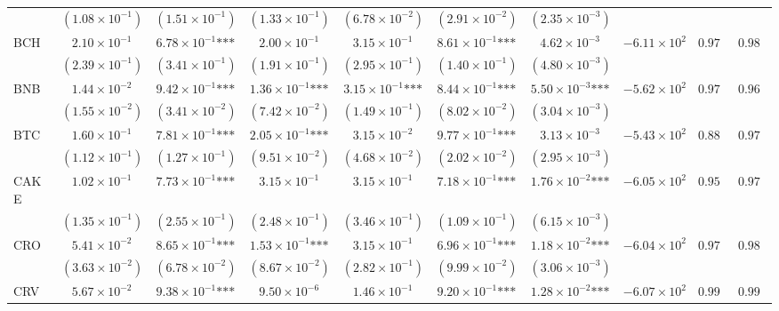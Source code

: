 \documentclass{article}
\begin{document}
\begin{landscape}
\begin{longtable}{lccccccccc}
 & $(1.08\times 10^{-1})$ & $(1.51\times 10^{-1})$ & $(1.33\times 10^{-1})$ & $(6.78\times 10^{-2})$ & $(2.91\times 10^{-2})$ & $(2.35\times 10^{-3})$ &  &  &  \\
BCH & $2.10\times 10^{-1}$ & $6.78\times 10^{-1}\text{***}$ & $2.00\times 10^{-1}$ & $3.15\times 10^{-1}$ & $8.61\times 10^{-1}\text{***}$ & $4.62\times 10^{-3}$ & $-6.11\times 10^{2}$ & $0.976$ & $0.980$ \\
 & $(2.39\times 10^{-1})$ & $(3.41\times 10^{-1})$ & $(1.91\times 10^{-1})$ & $(2.95\times 10^{-1})$ & $(1.40\times 10^{-1})$ & $(4.80\times 10^{-3})$ &  &  &  \\
BNB & $1.44\times 10^{-2}$ & $9.42\times 10^{-1}\text{***}$ & $1.36\times 10^{-1}\text{***}$ & $3.15\times 10^{-1}\text{***}$ & $8.44\times 10^{-1}\text{***}$ & $5.50\times 10^{-3}\text{***}$ & $-5.62\times 10^{2}$ & $0.978$ & $0.967$ \\
 & $(1.55\times 10^{-2})$ & $(3.41\times 10^{-2})$ & $(7.42\times 10^{-2})$ & $(1.49\times 10^{-1})$ & $(8.02\times 10^{-2})$ & $(3.04\times 10^{-3})$ &  &  &  \\
BTC & $1.60\times 10^{-1}$ & $7.81\times 10^{-1}\text{***}$ & $2.05\times 10^{-1}\text{***}$ & $3.15\times 10^{-2}$ & $9.77\times 10^{-1}\text{***}$ & $3.13\times 10^{-3}$ & $-5.43\times 10^{2}$ & $0.888$ & $0.977$ \\
 & $(1.12\times 10^{-1})$ & $(1.27\times 10^{-1})$ & $(9.51\times 10^{-2})$ & $(4.68\times 10^{-2})$ & $(2.02\times 10^{-2})$ & $(2.95\times 10^{-3})$ &  &  &  \\
CAKE & $1.02\times 10^{-1}$ & $7.73\times 10^{-1}\text{***}$ & $3.15\times 10^{-1}$ & $3.15\times 10^{-1}$ & $7.18\times 10^{-1}\text{***}$ & $1.76\times 10^{-2}\text{***}$ & $-6.05\times 10^{2}$ & $0.953$ & $0.978$ \\
 & $(1.35\times 10^{-1})$ & $(2.55\times 10^{-1})$ & $(2.48\times 10^{-1})$ & $(3.46\times 10^{-1})$ & $(1.09\times 10^{-1})$ & $(6.15\times 10^{-3})$ &  &  &  \\
CRO & $5.41\times 10^{-2}$ & $8.65\times 10^{-1}\text{***}$ & $1.53\times 10^{-1}\text{***}$ & $3.15\times 10^{-1}$ & $6.96\times 10^{-1}\text{***}$ & $1.18\times 10^{-2}\text{***}$ & $-6.04\times 10^{2}$ & $0.972$ & $0.987$ \\
 & $(3.63\times 10^{-2})$ & $(6.78\times 10^{-2})$ & $(8.67\times 10^{-2})$ & $(2.82\times 10^{-1})$ & $(9.99\times 10^{-2})$ & $(3.06\times 10^{-3})$ &  &  &  \\
CRV & $5.67\times 10^{-2}$ & $9.38\times 10^{-1}\text{***}$ & $9.50\times 10^{-6}$ & $1.46\times 10^{-1}$ & $9.20\times 10^{-1}\text{***}$ & $1.28\times 10^{-2}\text{***}$ & $-6.07\times 10^{2}$ & $0.992$ & $0.998$ \\

\end{longtable}
\end{landscape}
\end{document}
